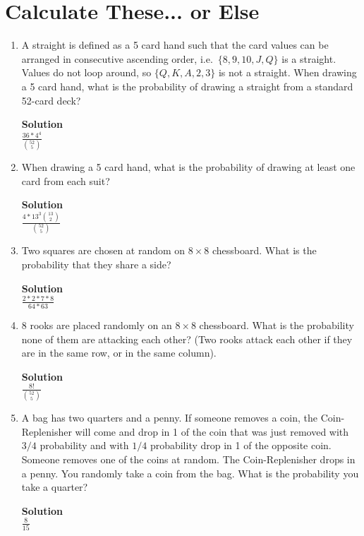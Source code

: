 \documentclass[11pt]{article}
\newcommand*{\Question}[1]{\section{#1}}
\newenvironment{Parts}{\begin{enumerate}[label=(\alph*)]}{\end{enumerate}}
\newcommand*{\Part}{\item}
\begin{document}
\Question{Calculate These... or Else}

\begin{Parts}

\Part 
A straight is defined as a 5 card hand such that the card values can be arranged in consecutive ascending order, i.e.\ $\{8,9,10,J,Q\}$ is a straight. Values do not loop around, so $\{Q, K, A, 2, 3\}$ is not a straight. When drawing a 5 card hand, what is the probability of drawing a straight from a standard 52-card deck?
\begin{mdframed} \textbf{Solution} \\
$\frac{36*4^4}{\binom{52}{5}}$
\end{mdframed}

\Part
When drawing a 5 card hand, what is the probability of drawing at least one card from each suit?
\begin{mdframed} \textbf{Solution} \\
$\frac{4*13^3\binom{13}{2}}{\binom{52}{5}}$
\end{mdframed}

\Part 
Two squares are chosen at random on $8\times 8$ chessboard. What is the probability that they share a side?
\begin{mdframed} \textbf{Solution} \\
$\frac{2*2*7*8}{64*63}$
\end{mdframed}

\Part 
8 rooks are placed randomly on an $8\times 8$ chessboard. What is the probability none of them are attacking each other? (Two rooks attack each other if they are in the same row, or in the same column).
\begin{mdframed} \textbf{Solution} \\
$\frac{8!}{\binom{52}{5}}$
\end{mdframed}

\Part A bag has two quarters and a penny. If someone removes a coin, the Coin-Replenisher will come and drop in 1 of the coin that was just removed with $3/4$ probability and with $1/4$ probability drop in 1 of the opposite coin. Someone removes one of the coins at random. The Coin-Replenisher drops in a penny. You randomly take a coin from the bag. What is the probability you take a quarter?
\begin{mdframed} \textbf{Solution} \\
$\frac{8}{15}$
\end{mdframed}

\end{Parts}
\end{document}
